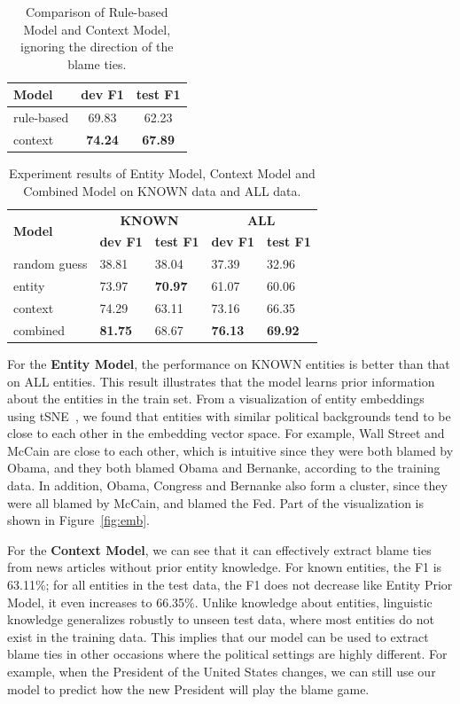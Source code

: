 \documentclass[letterpaper]{article}
\begin{document}
\begin{table}[t]
\centering
\begin{tabular}{l c c}
\hline
{\bf Model} & {\bf dev F1} & {\bf test F1} \\
\hline\hline
rule-based & 69.83 & 62.23 \\
context & {\bf 74.24} & {\bf 67.89} \\
\hline
\end{tabular}
\caption{Comparison of Rule-based Model and Context Model, ignoring the direction of the blame ties.}
\label{table:nodirection}
\end{table}

\begin{table}[t]
\centering
\begin{tabular}{l | p{1cm} p{1cm} | p{1cm} p{1cm}} 
\hline
\multirow{2}{2pt}{\bf Model} & \multicolumn{2}{c}{\bf KNOWN}  & \multicolumn{2}{c}{\bf ALL} \\
 & {\bf dev F1 } & {\bf test F1} & {\bf dev F1 } & {\bf test F1 } \\
\hline\hline
random guess & 38.81 & 38.04 & 37.39 & 32.96 \\
\hline
entity & 73.97 & {\bf 70.97} & 61.07 & 60.06 \\ 
\hline
context & 74.29  & 63.11 & 73.16 & 66.35 \\
\hline
combined & {\bf 81.75}  & 68.67 & {\bf 76.13}  & {\bf 69.92} \\
\hline
\end{tabular}
\caption{Experiment results of Entity Model, Context Model and Combined Model on KNOWN data and ALL data.}
\label{table:finalresult}
\end{table}

For the \textbf{Entity Model}, the performance on KNOWN entities is better than that on ALL entities. This result illustrates that the model learns prior information about the entities in the train set. From a visualization of entity embeddings using tSNE~\cite{maaten2008visualizing}, we found that entities with similar political backgrounds tend to be close to each other in the embedding vector space. For example, Wall Street and McCain are close to each other, which is intuitive since they were both blamed by Obama, and they both blamed Obama and Bernanke, according to the training data. In addition, Obama, Congress and Bernanke also form a cluster, since they were all blamed by McCain, and blamed the Fed. Part of the visualization is shown in Figure~\ref{fig:emb}.

For the \textbf{Context Model}, we can see that it can effectively extract blame ties from news articles without prior entity knowledge. For known entities, the F1 is 63.11\%; for all entities in the test data, the F1 does not decrease like Entity Prior Model, it even increases to 66.35\%. Unlike knowledge about entities, linguistic knowledge generalizes robustly to unseen test data, where most entities do not exist in the training data. This implies that our model can be used to extract blame ties in other occasions where the political settings are highly different. For example, when the President of the United States changes, we can still use our model to predict how the new President will play the blame game.
\end{document}
